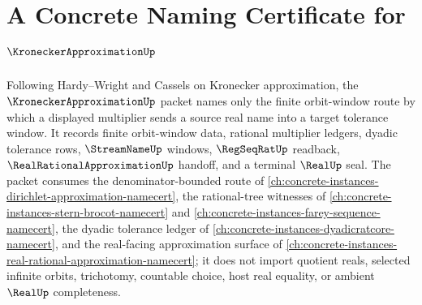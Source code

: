 \chapter{A Concrete Naming Certificate for $\KroneckerApproximationUp$}
\label{ch:concrete-instances-kronecker-approximation-namecert}

Following Hardy--Wright and Cassels on Kronecker approximation, the $\KroneckerApproximationUp$ packet names only the finite orbit-window route by which a displayed multiplier sends a source real name into a target tolerance window. It records finite orbit-window data, rational multiplier ledgers, dyadic tolerance rows, $\StreamNameUp$ windows, $\RegSeqRatUp$ readback, $\RealRationalApproximationUp$ handoff, and a terminal $\RealUp$ seal. The packet consumes the denominator-bounded route of \autoref{ch:concrete-instances-dirichlet-approximation-namecert}, the rational-tree witnesses of \autoref{ch:concrete-instances-stern-brocot-namecert} and \autoref{ch:concrete-instances-farey-sequence-namecert}, the dyadic tolerance ledger of \autoref{ch:concrete-instances-dyadicratcore-namecert}, and the real-facing approximation surface of \autoref{ch:concrete-instances-real-rational-approximation-namecert}; it does not import quotient reals, selected infinite orbits, trichotomy, countable choice, host real equality, or ambient $\RealUp$ completeness.

